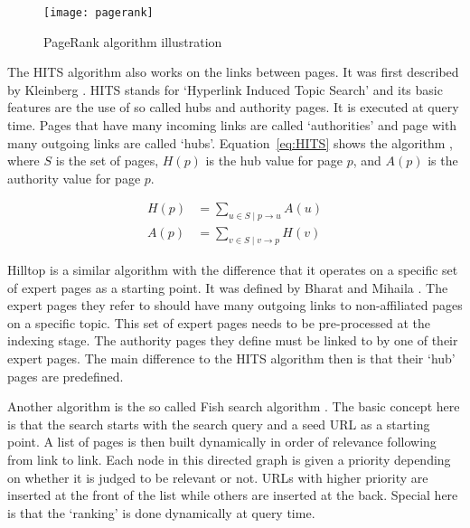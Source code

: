 \begin{figure}[!htbp] %
  \centering
  \texttt{[image: pagerank]}
\caption[PageRank algorithm]{PageRank algorithm illustration \autocite{Wikimedia2012}}
\label{fig:pagerank}
\end{figure}

The HITS algorithm also works on the links between pages. It was first described by Kleinberg \citeyear{Kleinberg1999, Kleinberg1999a}. HITS stands for `Hyperlink Induced Topic Search' and its basic features are the use of so called hubs and authority pages. It is executed at query time. Pages that have many incoming links are called `authorities' and page with many outgoing links are called `hubs'. Equation~\ref{eq:HITS} shows the algorithm \autocite[p.471]{Baeza-Yates2011}, where $S$ is the set of pages, $H(p)$ is the hub value for page $p$, and $A(p)$ is the authority value for page $p$.

\begin{equation}
  \begin{split}
  H(p) &= \sum_{u\in S \mid p\to u}A(u)\\
  A(p) &= \sum_{v\in S \mid v\to p}H(v)
  \end{split}
  \label{eq:HITS}
\end{equation}

Hilltop is a similar algorithm with the difference that it operates on a specific set of expert pages as a starting point. It was defined by Bharat and Mihaila \citeyear{Bharat2000}. The expert pages they refer to should have many outgoing links to non-affiliated pages on a specific topic. This set of expert pages needs to be pre-processed at the indexing stage. The authority pages they define must be linked to by one of their expert pages. The main difference to the HITS algorithm then is that their `hub' pages are predefined.

Another algorithm is the so called Fish search algorithm \citeyear{DeBra1994, DeBra1994a, DeBra1994b}. The basic concept here is that the search starts with the search query and a seed URL as a starting point. A list of pages is then built dynamically in order of relevance following from link to link. Each node in this directed graph is given a priority depending on whether it is judged to be relevant or not. URLs with higher priority are inserted at the front of the list while others are inserted at the back. Special here is that the `ranking' is done dynamically at query time.

